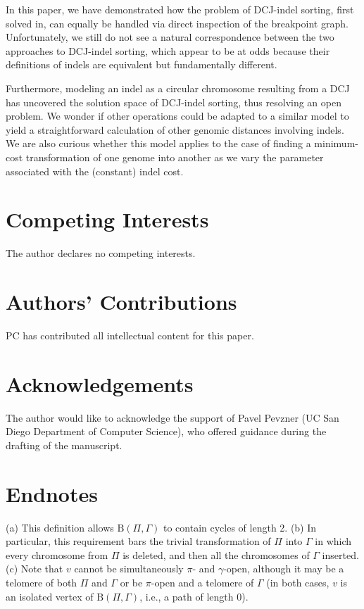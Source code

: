 In this paper, we have demonstrated how the problem of DCJ-indel sorting, first solved in\cite{braga2010}, can equally be handled via direct inspection of the breakpoint graph.  Unfortunately, we still do not see a natural correspondence between the two approaches to DCJ-indel sorting, which appear to be at odds because their definitions of indels are equivalent but fundamentally different.

Furthermore, modeling an indel as a circular chromosome resulting from a DCJ has uncovered the solution space of DCJ-indel sorting, thus resolving an open problem.  We wonder if other operations could be adapted to a similar model to yield a straightforward calculation of other genomic distances involving indels.  We are also curious whether this model applies to the case of finding a minimum-cost transformation of one genome into another as we vary the parameter associated with the (constant) indel cost.


\section*{Competing Interests}

The author declares no competing interests.

\section*{Authors' Contributions}

PC has contributed all intellectual content for this paper.

\section*{Acknowledgements}

The author would like to acknowledge the support of Pavel Pevzner (UC San Diego Department of Computer Science), who offered guidance during the drafting of the manuscript.

\section*{Endnotes}

(a) This definition allows $\textrm{B}(\Pi, \Gamma)$ to contain cycles of length 2. (b) In particular, this requirement bars the trivial transformation of $\Pi$ into $\Gamma$ in which every chromosome from $\Pi$ is deleted, and then all the chromosomes of $\Gamma$ inserted. (c) Note that $v$ cannot be simultaneously $\pi$- and $\gamma$-open, although it may be a telomere of both $\Pi$ and $\Gamma$ or be $\pi$-open and a telomere of $\Gamma$ (in both cases, $v$ is an isolated vertex of $\textrm{B}(\Pi, \Gamma)$, i.e., a path of length $0$).


